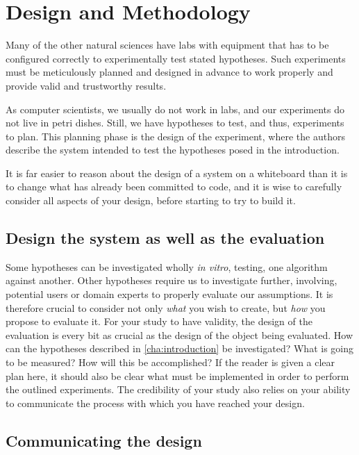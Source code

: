 \chapter{Design and Methodology}
\label{cha:design-and-method}

Many of the other natural sciences have labs with equipment that has
to be configured correctly to experimentally test stated hypotheses.
Such experiments must be meticulously planned and designed in advance
to work properly and provide valid and trustworthy results.

As computer scientists, we usually do not work in labs, and our
experiments do not live in petri dishes. Still, we have hypotheses to
test, and thus, experiments to plan. This planning phase is the design
of the experiment, where the authors describe the system intended to
test the hypotheses posed in the introduction. 

It is far easier to reason about the design of a system on a
whiteboard than it is to change what has already been committed to
code, and it is wise to carefully consider all aspects of your design,
before starting to try to build it.


\section{Design the system as well as the evaluation}
\label{sec:design-system-as}

Some hypotheses can be investigated wholly \emph{in vitro}, testing,
\eg one algorithm against another. Other hypotheses require us to
investigate further, involving, \eg potential users or domain experts
to properly evaluate our assumptions. It is therefore crucial to
consider not only \emph{what} you wish to create, but \emph{how} you
propose to evaluate it. For your study to have validity, the design of
the evaluation is every bit as crucial as the design of the object
being evaluated.  How can the hypotheses described in
\autoref{cha:introduction} be investigated?  What is going to be
measured? How will this be accomplished? If the reader is given a
clear plan here, it should also be clear what must be implemented in
order to perform the outlined experiments.  The credibility of your
study also relies on your ability to communicate the process with
which you have reached your design.

\section{Communicating the design}
\label{sec:communicating-design}

